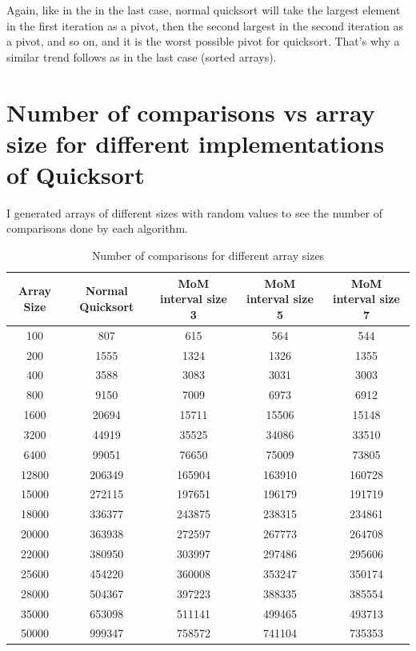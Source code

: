 \documentclass{report}
\begin{document}
Again, like in the in the last case, normal quicksort will take the largest element in the first iteration as a pivot, then the second largest in the second iteration as a pivot, and so on, and it is the worst possible pivot for quicksort. That's why a similar trend follows as in the last case (sorted arrays).


\section*{Number of comparisons vs array size for different implementations of Quicksort}

I generated arrays of different sizes with random values to see the number of comparisons done by each algorithm.


\begin{table}[H]
\centering
\footnotesize %
\begin{tabular}{|c|c|c|c|c|}
\hline
\textbf{Array Size} & \textbf{Normal Quicksort} & \textbf{MoM interval size 3} & \textbf{MoM interval size 5} & \textbf{MoM interval size 7} \\ \hline
100    & 807     & 615     & 564     & 544     \\ \hline
200    & 1555    & 1324    & 1326    & 1355    \\ \hline
400    & 3588    & 3083    & 3031    & 3003    \\ \hline
800    & 9150    & 7009    & 6973    & 6912    \\ \hline
1600   & 20694   & 15711   & 15506   & 15148   \\ \hline
3200   & 44919   & 35525   & 34086   & 33510   \\ \hline
6400   & 99051   & 76650   & 75009   & 73805   \\ \hline
12800  & 206349  & 165904  & 163910  & 160728  \\ \hline
15000  & 272115  & 197651  & 196179  & 191719  \\ \hline
18000  & 336377  & 243875  & 238315  & 234861  \\ \hline
20000  & 363938  & 272597  & 267773  & 264708  \\ \hline
22000  & 380950  & 303997  & 297486  & 295606  \\ \hline
25600  & 454220  & 360008  & 353247  & 350174  \\ \hline
28000  & 504367  & 397223  & 388335  & 385554  \\ \hline
35000  & 653098  & 511141  & 499465  & 493713  \\ \hline
50000  & 999347  & 758572  & 741104  & 735353  \\ \hline
\end{tabular}
\caption{Number of comparisons for different array sizes}
\label{table:quicksort_execution_times}
\end{table}
\end{document}
